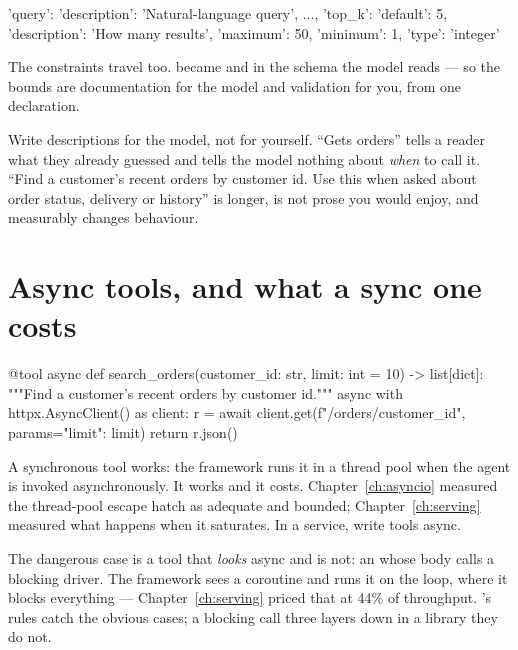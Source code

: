 \begin{console}
{'query': {'description': 'Natural-language query', ...},
 'top_k': {'default': 5, 'description': 'How many results',
           'maximum': 50, 'minimum': 1, 'type': 'integer'}}
\end{console}

The constraints travel too.  became  and
 in the schema the model reads --- so the bounds are documentation
for the model and validation for you, from one declaration.

\begin{warning}
Write descriptions for the model, not for yourself. ``Gets orders'' tells a
reader what they already guessed and tells the model nothing about \emph{when} to
call it. ``Find a customer's recent orders by customer id. Use this when asked
about order status, delivery or history'' is longer, is not prose you would
enjoy, and measurably changes behaviour.
\end{warning}

\section{Async tools, and what a sync one costs}
\label{sec:async-tools}

\begin{python}[caption={The shape to write in a service}, label={lst:async-tool}]
@tool
async def search_orders(customer_id: str, limit: int = 10) -> list[dict]:
    """Find a customer's recent orders by customer id."""
    async with httpx.AsyncClient() as client:
        r = await client.get(f"/orders/{customer_id}", params={"limit": limit})
        return r.json()
\end{python}

A synchronous tool works: the framework runs it in a thread pool when the agent
is invoked asynchronously. It works and it costs. Chapter~\ref{ch:asyncio}
measured the thread-pool escape hatch as adequate and bounded;
Chapter~\ref{ch:serving} measured what happens when it saturates. In a service,
write tools async.

\begin{warning}
The dangerous case is a tool that \emph{looks} async and is not: an
 whose body calls a blocking driver. The framework sees a
coroutine and runs it on the loop, where it blocks everything ---
Chapter~\ref{ch:serving} priced that at 44\% of throughput. 's
 rules catch the obvious cases; a blocking call three layers down in
a library they do not.
\end{warning}

